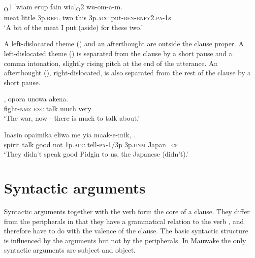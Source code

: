 \ea%
\label{ex:x930}
\textsubscript{O}1  [wiam  erup  fain  wia]\textsubscript{O}2 wu-om-a-m. \\
     meat  little  3p.\textsc{refl}  two  this  3p.\textsc{acc} put-\textsc{ben}-\textsc{bnfy}2.\textsc{pa}-1s \\
\glt `A bit of the meat I put (aside) for these two.'
\z

A left-dislocated theme () and an afterthought are outside the clause proper.  A left-dislocated theme () is separated from the clause by a short pause and a comma intonation, slightly rising pitch at the end of the utterance.  An afterthought (), right-dislocated, is also separated from the rest of the clause by a short pause.

\ea%
\label{ex:x935}
\gll {},  opora  unowa  akena. \\
     fight-\textsc{nmz}  \textsc{exc}  talk  much  very \\
\glt `The war, now - there is much to talk about.'
\z

\ea%
\label{ex:x929}
\gll Inasin  opaimika  eliwa  me  yia  maak-e-mik,   . \\
     spirit  talk  good  not  1p.\textsc{acc}  tell-\textsc{pa}-1/3p  3p.\textsc{unm} Japan=\textsc{cf} \\
\glt `They didn't speak good Pidgin to us, the Japanese (didn't).'
\z

\section{Syntactic arguments}
\hypertarget{RefHeading21941935131865}{}
Syntactic arguments together with the verb form the core of a clause. They differ from the peripherals in that they have a grammatical relation to the verb \citep[][77-80]{FoleyEtAl1984}, and therefore have to do with the valence of the clause. The basic syntactic structure is influenced by the arguments but not by the peripherals.  In Mauwake the only syntactic arguments are subject and object. 

